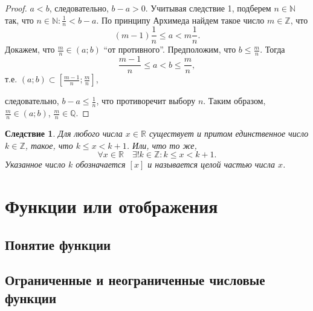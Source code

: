 \documentclass[a4paper,12pt]{article} %
\newtheorem{corollary}{Следствие}[theorem]
\theoremstyle{remark}
\theoremstyle{definition}
\begin{document}
\begin{proof}
    $a < b$, следовательно, $b - a > 0$. Учитывая следствие 1, подберем $n\in \mathbb{N}$ так, что $\displaystyle n\in \mathbb{N} : \frac{1}{n} < b-a$.
    По принципу Архимеда найдем такое число $m\in \mathbb{Z}$, что 
    \[(m-1)\frac{1}{n} \le a < m\frac{1}{n}.\]
    Докажем, что $\displaystyle \frac{m}{n} \in (a; b)$ ``от противного''. Предположим, что $\displaystyle b \le \frac{m}{n}$.
    Тогда
    \[\frac{m-1}{n} \le a < b \le \frac{m}{n},\]
    т.е. $\displaystyle (a; b) \subset \left[\frac{m-1}{n}; \frac{m}{n}\right]$,

	\begin{center}
	\end{center}
    следовательно, $\displaystyle b-a \le \frac{1}{n}$, что противоречит выбору $n$.
    Таким образом, $\displaystyle \frac{m}{n} \in (a; b)$, $\displaystyle \frac{m}{n}\in \mathbb{Q}$.

\end{proof}
\begin{corollary}
    Для любого числа $x \in \mathbb{R}$ существует и притом единственное число $k \in \mathbb{Z}$,
    такое, что $k \le x < k + 1$. Или, что то же,
    \[\forall x \in \mathbb{R} \quad \exists ! k \in \mathbb{Z} : k \le  x < k + 1.\] 
    Указанное число $k$ обозначается $[x]$ и называется целой частью числа $x$.
\end{corollary}


\newpage
\section{Функции или отображения}
\subsection{Понятие функции}
\subsection{Ограниченные и неограниченные числовые функции}
\end{document}

